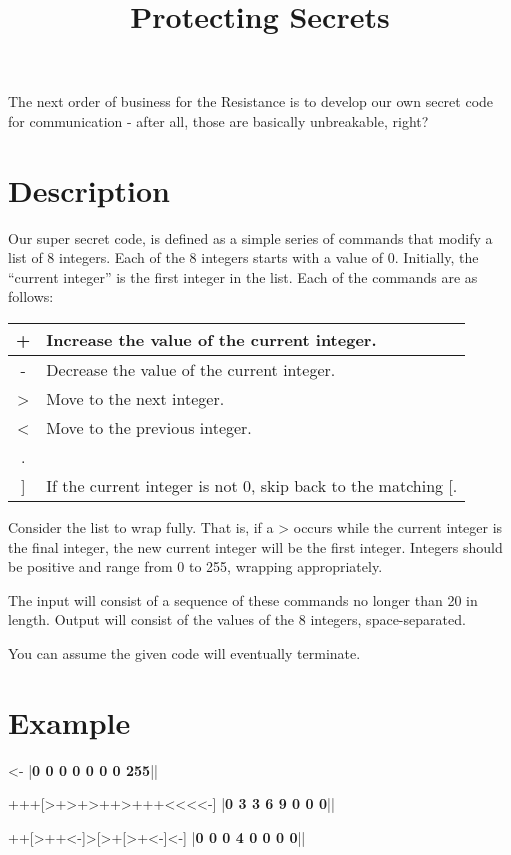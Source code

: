 \documentclass{../codeproblem}
\begin{document}
\title{Protecting Secrets}

\begin{flavor}
  The next order of business for the Resistance is to develop our own secret code for communication - after all, those are basically unbreakable, right?
\end{flavor}

\section*{Description}
Our super secret code, is defined as a simple series of commands that modify a list of 8 integers. Each of the 8 integers starts with a value of 0. Initially, the ``current integer'' is the first integer in the list.  Each of the commands are as follows:

\begin{center}
\begin{tabular}{| c | l |}\hline
  + & Increase the value of the current integer.\\\hline
  - & Decrease the value of the current integer.\\\hline
  > & Move to the next integer.\\\hline
  < & Move to the previous integer.\\\hline
  [ & If the current integer is 0, skip to after the matching ].\\\hline
  ] & If the current integer is not 0, skip back to the matching [.\\\hline
\end{tabular}
\end{center}

Consider the list to wrap fully. That is, if a > occurs while the current integer is the final integer, the new current integer will be the first integer. Integers should be positive and range from 0 to 255, wrapping appropriately.

The input will consist of a sequence of these commands no longer than 20 in length. Output will consist of the values of the 8 integers, space-separated.

You can assume the given code will eventually terminate.

\section*{Example}
\begin{example}
<-
|\textbf{0 0 0 0 0 0 0 255}||\end{example}

\begin{example}
+++[>+>+>++>+++<<<<-]
|\textbf{0 3 3 6 9 0 0 0}||\end{example}

\begin{example}
++[>++<-]>[>+[>+<-]<-]
|\textbf{0 0 0 4 0 0 0 0}||\end{example}
\end{document}
